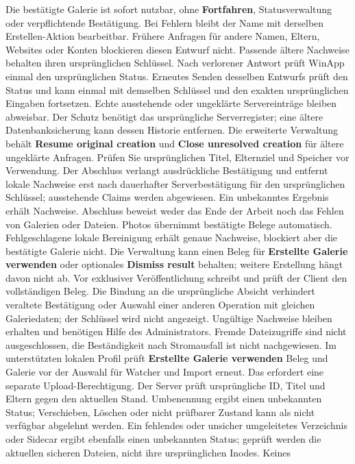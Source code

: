 \documentclass[11pt,a4paper]{article}
\newcommand{\ui}[1]{\textbf{#1}}
\begin{document}
Die bestätigte Galerie ist sofort nutzbar, ohne \ui{Fortfahren},
Statusverwaltung oder verpflichtende Bestätigung. Bei Fehlern bleibt der Name
mit derselben Erstellen-Aktion bearbeitbar. Frühere Anfragen für andere Namen,
Eltern, Websites oder Konten blockieren diesen Entwurf nicht. Passende ältere
Nachweise behalten ihren ursprünglichen Schlüssel. Nach verlorener Antwort
prüft WinApp einmal den ursprünglichen Status. Erneutes Senden desselben
Entwurfs prüft den Status und kann einmal mit demselben Schlüssel und den
exakten ursprünglichen Eingaben fortsetzen. Echte ausstehende oder ungeklärte
Servereinträge bleiben abweisbar. Der Schutz benötigt das ursprüngliche
Serverregister; eine ältere Datenbanksicherung kann dessen Historie entfernen.
Die erweiterte Verwaltung behält \ui{Resume original creation} und
\ui{Close unresolved creation} für ältere ungeklärte Anfragen. Prüfen Sie
ursprünglichen Titel, Elternziel und Speicher vor Verwendung. Der Abschluss
verlangt ausdrückliche Bestätigung und entfernt lokale Nachweise erst nach
dauerhafter Serverbestätigung für den ursprünglichen Schlüssel; ausstehende
Claims werden abgewiesen. Ein unbekanntes Ergebnis erhält Nachweise. Abschluss
beweist weder das Ende der Arbeit noch das Fehlen von Galerien oder Dateien.
Photos übernimmt bestätigte Belege automatisch. Fehlgeschlagene lokale
Bereinigung erhält genaue Nachweise, blockiert aber die bestätigte Galerie
nicht. Die Verwaltung kann einen Beleg für \ui{Erstellte Galerie verwenden}
oder optionales \ui{Dismiss result} behalten; weitere Erstellung hängt davon
nicht ab. Vor exklusiver Veröffentlichung schreibt und prüft der Client den
vollständigen Beleg. Die Bindung an die ursprüngliche Absicht verhindert
veraltete Bestätigung oder Auswahl einer anderen Operation mit gleichen
Galeriedaten; der Schlüssel wird nicht angezeigt. Ungültige Nachweise bleiben
erhalten und benötigen Hilfe des Administrators.
Fremde Dateizugriffe sind nicht ausgeschlossen, die Beständigkeit
nach Stromausfall ist nicht nachgewiesen. Im unterstützten lokalen
Profil prüft \ui{Erstellte Galerie verwenden} Beleg und Galerie vor
der Auswahl für Watcher und Import erneut. Das erfordert eine separate
Upload-Berechtigung. Der Server prüft
ursprüngliche ID, Titel und Eltern gegen den aktuellen Stand. Umbenennung ergibt
einen unbekannten Status; Verschieben, Löschen oder nicht prüfbarer Zustand kann
als nicht verfügbar abgelehnt werden. Ein fehlendes oder unsicher umgeleitetes
Verzeichnis oder Sidecar ergibt ebenfalls einen unbekannten Status; geprüft
werden die aktuellen sicheren Dateien, nicht ihre ursprünglichen Inodes. Keines
\end{document}
